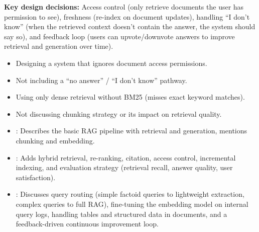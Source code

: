 \begin{interviewq}
\textbf{Key design decisions:} Access control (only retrieve documents the user has permission
to see), freshness (re-index on document updates), handling ``I don't know'' (when the
retrieved context doesn't contain the answer, the system should say so), and feedback loop
(users can upvote/downvote answers to improve retrieval and generation over time).

\redflags
\begin{itemize}
    \item Designing a system that ignores document access permissions.
    \item Not including a ``no answer'' / ``I don't know'' pathway.
    \item Using only dense retrieval without BM25 (misses exact keyword matches).
    \item Not discussing chunking strategy or its impact on retrieval quality.
\end{itemize}


\goodgreat
\begin{itemize}
    \item {}: Describes the basic RAG pipeline with retrieval and generation,
    mentions chunking and embedding.
    \item {}: Adds hybrid retrieval, re-ranking, citation, access control,
    incremental indexing, and evaluation strategy (retrieval recall, answer quality, user
    satisfaction).
    \item {}: Discusses query routing (simple factoid queries to lightweight
    extraction, complex queries to full RAG), fine-tuning the embedding model on internal
    query logs, handling tables and structured data in documents, and a feedback-driven
    continuous improvement loop.
\end{itemize}

\end{interviewq}

\vspace{0.5em}

